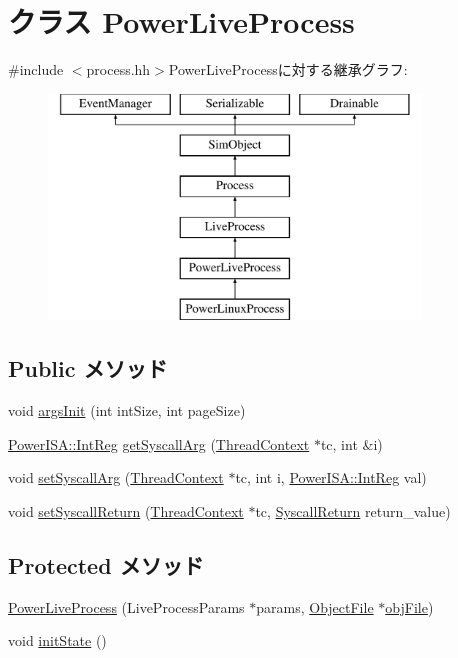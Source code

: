 \hypertarget{classPowerLiveProcess}{
\section{クラス PowerLiveProcess}
\label{classPowerLiveProcess}
}


{\ttfamily \#include $<$process.hh$>$}PowerLiveProcessに対する継承グラフ:\begin{figure}[H]
\begin{center}
\leavevmode
\includegraphics[height=6cm]{classPowerLiveProcess}
\end{center}
\end{figure}
\subsection*{Public メソッド}
\begin{DoxyCompactItemize}
\item 
void \hyperlink{classPowerLiveProcess_a60e5314ffeede1e51c6bcb2cf606ca92}{argsInit} (int intSize, int pageSize)
\item 
\hyperlink{namespacePowerISA_a0e080577527fb3e9685399f75b5caf15}{PowerISA::IntReg} \hyperlink{classPowerLiveProcess_a4a1521e60b3fd8333fc98a5565c484ec}{getSyscallArg} (\hyperlink{classThreadContext}{ThreadContext} $\ast$tc, int \&i)
\item 
void \hyperlink{classPowerLiveProcess_a1e515b39cc799824d1dd93d40ba28416}{setSyscallArg} (\hyperlink{classThreadContext}{ThreadContext} $\ast$tc, int i, \hyperlink{namespacePowerISA_a0e080577527fb3e9685399f75b5caf15}{PowerISA::IntReg} val)
\item 
void \hyperlink{classPowerLiveProcess_aaefd02663c1eae206b851290d9276a5e}{setSyscallReturn} (\hyperlink{classThreadContext}{ThreadContext} $\ast$tc, \hyperlink{classSyscallReturn}{SyscallReturn} return\_\-value)
\end{DoxyCompactItemize}
\subsection*{Protected メソッド}
\begin{DoxyCompactItemize}
\item 
\hyperlink{classPowerLiveProcess_af5aa42a7d1a5ffdd21ec2c4d8b8a5890}{PowerLiveProcess} (LiveProcessParams $\ast$params, \hyperlink{classObjectFile}{ObjectFile} $\ast$\hyperlink{classLiveProcess_ab6cfcfa7903c66267b3e0351c3caa809}{objFile})
\item 
void \hyperlink{classPowerLiveProcess_a3c34ea9b29f410748d4435a667484924}{initState} ()
\end{DoxyCompactItemize}


